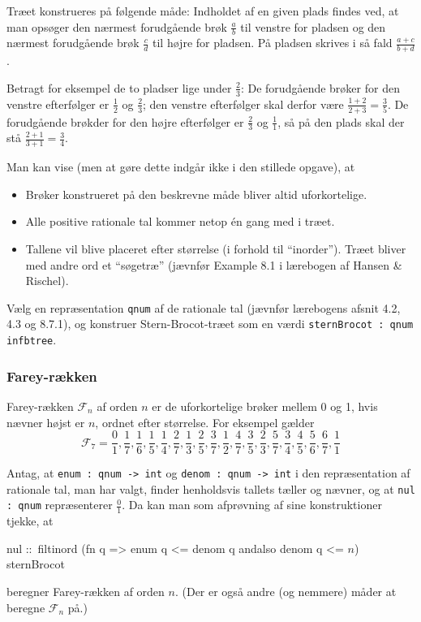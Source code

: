 \documentclass[a4paper]{article}
\newenvironment{program}{\begin{flushleft}\ttfamily\begin{tabbing}}%
{\end{tabbing}\end{flushleft}}
\begin{document}
Tr{\ae}et konstrueres p{\aa} f{\o}lgende m{\aa}de:  Indholdet af en given
plads findes ved, at man ops{\o}ger den n{\ae}rmest forudg{\aa}ende br{\o}k
$\frac{a}b$ til venstre for pladsen og den n{\ae}rmest forudg{\aa}ende br{\o}k
$\frac{c}d$ til h{\o}jre for pladsen.  P{\aa} pladsen skrives i s{\aa} fald
$\frac{a+c}{b+d}$.

Betragt for eksempel de to pladser lige under $\frac23$:
De forudg{\aa}ende br{\o}ker for den venstre efterf{\o}lger er $\frac12$
og $\frac23$; den venstre efterf{\o}lger skal derfor v{\ae}re
$\frac{1+2}{2+3}=\frac35$.  De forudg{\aa}ende br{\o}kder for den
h{\o}jre efterf{\o}lger er $\frac23$ og $\frac11$, s{\aa} p{\aa}
den plads skal der st{\aa} $\frac{2+1}{3+1}=\frac34$.

Man kan vise (men at g{\o}re dette indg{\aa}r ikke i den stillede opgave), at
\begin{itemize}
\item Br{\o}ker konstrueret p{\aa} den beskrevne m{\aa}de bliver altid
uforkortelige.
\item Alle positive rationale tal kommer netop \'en gang med i tr{\ae}et.
\item Tallene vil blive placeret efter st{\o}rrelse (i forhold til
``inorder'').  Tr{\ae}et bliver med andre ord et ``s{\o}getr{\ae}''
(j{\ae}vnf{\o}r Example 8.1 i l{\ae}rebogen af Hansen \& Rischel).
\end{itemize}

V{\ae}lg en repr{\ae}sentation \texttt{qnum} af de rationale tal
(j{\ae}vnf{\o}r l{\ae}rebogens afsnit 4.2, 4.3 og 8.7.1), og konstruer
Stern-Brocot-tr{\ae}et som en v{\ae}rdi \texttt{sternBrocot :\ qnum infbtree}.

\subsubsection*{Farey-r{\ae}kken}

Farey-r{\ae}kken $\mathcal{F}_n$ af orden $n$ er de
uforkortelige br{\o}ker mellem 0 og 1, hvis n{\ae}vner h{\o}jst er $n$,
ordnet efter st{\o}rrelse.
For eksempel g{\ae}lder
\[\mathcal{F}_7 = \frac01,\frac17,\frac16,\frac15,\frac14,\frac27,\frac13,\frac25,\frac37,
\frac12,\frac47,\frac35,\frac23,\frac57,\frac34,\frac45,\frac56,\frac67,\frac11\]

Antag, at \texttt{enum :\ qnum -> int} og \texttt{denom :\ qnum -> int}
i den repr{\ae}sentation af rationale tal,
man har valgt, finder henholdsvis tallets t{\ae}ller og n{\ae}vner,
og at \texttt{nul :\ qnum} repr{\ae}senterer $\frac01$.
Da kan man som afpr{\o}vning af sine
konstruktioner tjekke, at
\begin{program}
nul ::\ filtinord (fn q => enum q <= denom q andalso denom q <= $n$) sternBrocot
\end{program}
beregner Farey-r{\ae}kken af orden $n$.
(Der er ogs{\aa} andre (og nemmere) m{\aa}der at beregne $\mathcal{F}_n$ p{\aa}.)
\end{document}
